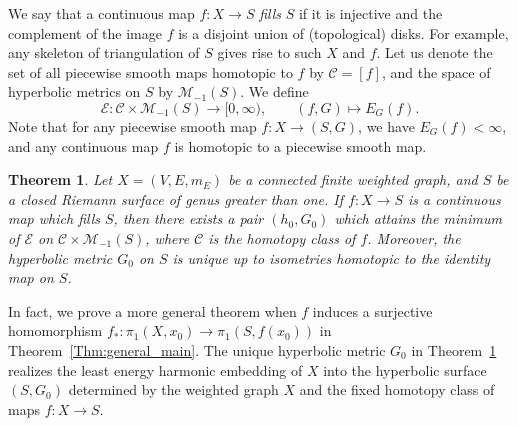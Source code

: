 \documentclass[11pt]{article}
\newtheorem{theo}{Theorem}[section]
\theoremstyle{definition}
\newcommand{\Mc}{\mathcal{M}}
\numberwithin{equation}{section}
\newcommand{\Cc}{\mathcal{C}}
\renewcommand{\Mc}{\mathcal{M}}
\newcommand{\Ec}{\mathcal{E}}
\begin{document}
We say that a continuous map $f:X \to S$ \emph{fills} $S$ if it is injective and the complement of the image $f$ is a disjoint union of (topological) disks. For example, any skeleton of triangulation of $S$ gives rise to such $X$ and $f$. Let us denote the set of all piecewise smooth maps homotopic to $f$ by $\Cc=[f]$, and the space of hyperbolic metrics on $S$ by $\Mc_{-1}(S)$. We define
\[
\Ec: \Cc \times \Mc_{-1}(S) \to [0, \infty), \qquad (f, G) \mapsto E_G(f).
\]
Note that for any piecewise smooth map $f: X \to (S, G)$, we have $E_G(f)<\infty$, and any continuous map $f$ is homotopic to a piecewise smooth map.

\begin{theo}\label{Thm:main}
Let $X=(V, E, m_E)$ be a connected finite weighted graph, and $S$ be a closed Riemann surface of genus greater than one. If $f:X \to S$ is a continuous map which fills $S$, then there exists a pair $(h_0, G_0)$ which attains the minimum of $\Ec$ on $\Cc \times \Mc_{-1}(S)$, where $\Cc$ is the homotopy class of $f$. Moreover, the hyperbolic metric $G_0$ on $S$ is unique up to isometries homotopic to the identity map on $S$.
\end{theo}



In fact, we prove a more general theorem when $f$ induces a surjective homomorphism $f_\ast: \pi_1(X, x_0) \to \pi_1(S, f(x_0))$ in Theorem~\ref{Thm:general_main}. The unique hyperbolic metric $G_0$ in Theorem~\ref{Thm:main} realizes the least energy harmonic embedding of $X$ into the hyperbolic surface $(S, G_0)$ determined by the weighted graph $X$ and the fixed homotopy class of maps $f: X \to S$.
\end{document}
